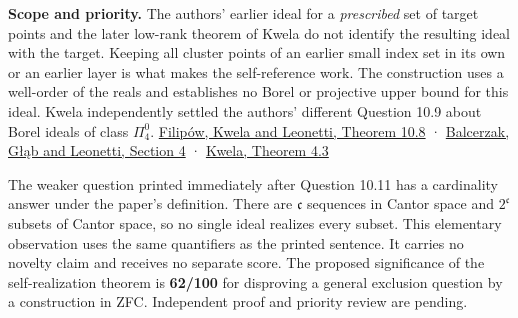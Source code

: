 \documentclass[11pt]{article}
\begin{document}
\textbf{Scope and priority.} The authors' earlier ideal for a \emph{prescribed} set of target points and the later low-rank theorem of Kwela do not identify the resulting ideal with the target. Keeping all cluster points of an earlier small index set in its own or an earlier layer is what makes the self-reference work. The construction uses a well-order of the reals and establishes no Borel or projective upper bound for this ideal. Kwela independently settled the authors' different Question 10.9 about Borel ideals of class \(\Pi^0_4\). \href{https://arxiv.org/abs/2411.10866}{Filipów, Kwela and Leonetti, Theorem 10.8} · \href{https://arxiv.org/abs/2407.12160}{Balcerzak, Głąb and Leonetti, Section 4} · \href{https://arxiv.org/abs/2611.03432}{Kwela, Theorem 4.3}

The weaker question printed immediately after Question 10.11 has a cardinality answer under the paper's definition. There are \(\mathfrak c\) sequences in Cantor space and \(2^{\mathfrak c}\) subsets of Cantor space, so no single ideal realizes every subset. This elementary observation uses the same quantifiers as the printed sentence. It carries no novelty claim and receives no separate score. The proposed significance of the self-realization theorem is \textbf{62/100} for disproving a general exclusion question by a construction in ZFC. Independent proof and priority review are pending.
\end{document}
